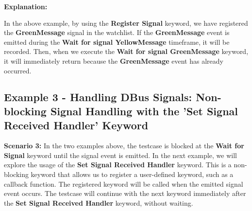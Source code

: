 
\textbf{Explanation:}

In the above example, by using the \textbf{Register Signal} keyword, we have registered the \textbf{GreenMessage} signal in the watchlist. If the \textbf{GreenMessage} event is emitted
during the \textbf{Wait for signal YellowMessage} timeframe, it will be recorded. Then, when we execute the \textbf{Wait for signal GreenMessage} keyword, it will immediately return
because the \textbf{GreenMessage} event has already occurred.


\hypertarget{description-example3}{%
\subsection{\texorpdfstring{\textbf{Example 3 - Handling DBus Signals: Non-blocking Signal Handling with the 'Set Signal Received Handler' Keyword}}{Example 3 - Handling DBus Signals: Non-blocking Signal Handling with the 'Set Signal Received Handler' Keyword}}\label{description-example3}}

\textbf{Scenario 3:}
In the two examples above, the testcase is blocked at the \textbf{Wait for Signal} keyword until the signal event is emitted. In the next example, we will explore the usage of
the \textbf{Set Signal Received Handler} keyword. This is a non-blocking keyword that allows us to register a user-defined keyword, such as a callback function. The registered
keyword will be called when the emitted signal event occurs. The testcase will continue with the next keyword immediately after the \textbf{Set Signal Received Handler} keyword, without waiting.


